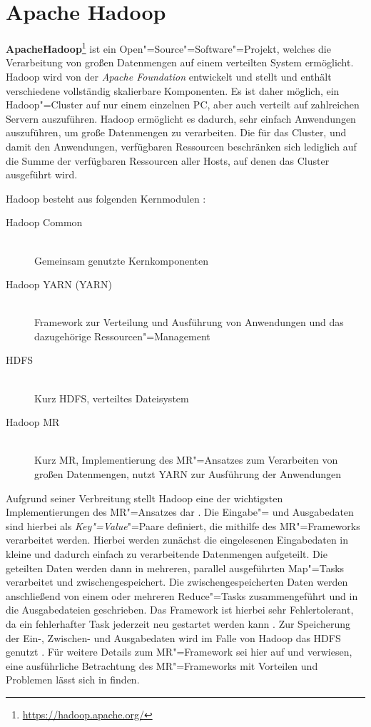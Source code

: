 \section{Apache Hadoop}
\label{sec:hadoop}

\textbf{Apache\texttrademark Hadoop\textregistered}\footnote{\url{https://hadoop.apache.org/}} ist ein Open"=Source"=Software"=Projekt, welches die Verarbeitung von großen Datenmengen auf einem verteilten System ermöglicht.
Hadoop wird von der \emph{Apache Foundation} entwickelt und stellt und enthält verschiedene vollständig skalierbare Komponenten.
Es ist daher möglich, ein Hadoop"=Cluster auf nur einem einzelnen PC, aber auch verteilt auf zahlreichen Servern auszuführen.
Hadoop ermöglicht es dadurch, sehr einfach Anwendungen auszuführen, um große Datenmengen zu verarbeiten.
Die für das Cluster, und damit den Anwendungen, verfügbaren Ressourcen beschränken sich lediglich auf die Summe der verfügbaren Ressourcen aller Hosts, auf denen das Cluster ausgeführt wird.

Hadoop besteht aus folgenden Kernmodulen \cite{HadoopHomePage}:

\begin{description}
	\item[Hadoop Common] \hfill \\
        Gemeinsam genutzte Kernkomponenten
	\item[Hadoop \acs{YARN} (\acl{YARN})] \hfill \\
        Framework zur Verteilung und Ausführung von Anwendungen und das dazugehörige Ressourcen"=Management
	\item[\acl{HDFS}] \hfill \\
        Kurz \acs{HDFS}, verteiltes Dateisystem
	\item[Hadoop \acl{MR}] \hfill \\
        Kurz \acs{MR}, Implementierung des \ac{MR}"=Ansatzes zum Verarbeiten von großen Datenmengen, nutzt \ac{YARN} zur Ausführung der Anwendungen
\end{description}

Aufgrund seiner Verbreitung stellt Hadoop eine der wichtigsten Implementierungen des \ac{MR}"=Ansatzes dar \cite{PoweredByHadoop}.
Die Eingabe"= und Ausgabedaten sind hierbei als \emph{Key"=Value}"=Paare definiert, die mithilfe des \ac{MR}"=Frameworks verarbeitet werden.
Hierbei werden zunächst die eingelesenen Eingabedaten in kleine und dadurch einfach zu verarbeitende Datenmengen aufgeteilt.
Die geteilten Daten werden dann in mehreren, parallel ausgeführten Map"=Tasks verarbeitet und zwischengespeichert.
Die zwischengespeicherten Daten werden anschließend von einem oder mehreren Reduce"=Tasks zusammengeführt und in die Ausgabedateien geschrieben.
Das Framework ist hierbei sehr Fehlertolerant, da ein fehlerhafter Task jederzeit neu gestartet werden kann \cite{Dean2004,Dean2010}.
Zur Speicherung der Ein-, Zwischen- und Ausgabedaten wird im Falle von Hadoop das \ac{HDFS} genutzt \cite{HadoopMapRedTutorial271}.
Für weitere Details zum \ac{MR}"=Framework sei hier auf \cite{Dean2004} und \cite{Dean2010} verwiesen, eine ausführliche Betrachtung des \ac{MR}"=Frameworks mit Vorteilen und Problemen lässt sich in \cite{Lee2012} finden.

